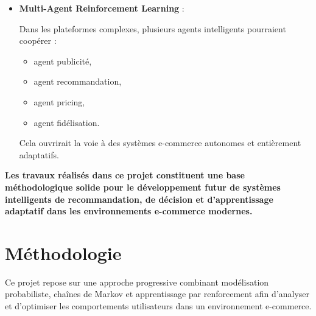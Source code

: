 \documentclass[11pt,a4paper]{article}
\begin{document}
\begin{itemize}
Cela permettrait :
\begin{itemize}
    \item des recommandations instantanées,
    \item des politiques adaptatives en ligne,
    \item et une personnalisation temps réel.
\end{itemize}

\vspace{0.2cm}

\item \textbf{Multi-Agent Reinforcement Learning} :

Dans les plateformes complexes,
plusieurs agents intelligents
pourraient coopérer :

\begin{itemize}
    \item agent publicité,
    \item agent recommandation,
    \item agent pricing,
    \item agent fidélisation.
\end{itemize}

Cela ouvrirait la voie
à des systèmes e-commerce autonomes
et entièrement adaptatifs.

\end{itemize}

\vspace{0.5cm}

\begin{center}
\begin{tcolorbox}[
colback=LightBlue,
colframe=DarkBlue,
width=14cm,
arc=6pt]

\centering

\textbf{
Les travaux réalisés dans ce projet
constituent une base méthodologique solide
pour le développement futur
de systèmes intelligents de recommandation,
de décision et d’apprentissage adaptatif
dans les environnements e-commerce modernes.
}

\end{tcolorbox}
\end{center}
\newpage
\section{Méthodologie}

Ce projet repose sur une approche progressive combinant modélisation probabiliste, chaînes de Markov et apprentissage par renforcement afin d’analyser et d’optimiser les comportements utilisateurs dans un environnement e-commerce.
\end{document}
